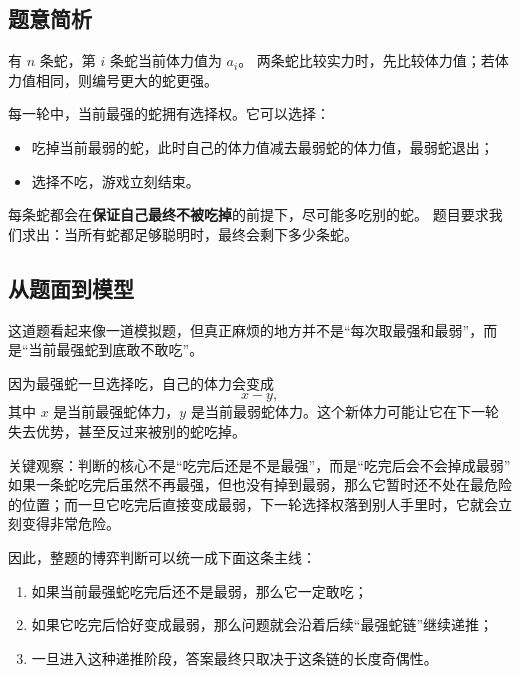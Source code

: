\documentclass{book}
\begin{document}
\subsection{题意简析}

有 $n$ 条蛇，第 $i$ 条蛇当前体力值为 $a_i$。  
两条蛇比较实力时，先比较体力值；若体力值相同，则编号更大的蛇更强。

每一轮中，当前最强的蛇拥有选择权。它可以选择：

\begin{itemize}[leftmargin=2em,itemsep=1pt,topsep=2pt,parsep=0pt,partopsep=0pt]
    \item 吃掉当前最弱的蛇，此时自己的体力值减去最弱蛇的体力值，最弱蛇退出；
    \item 选择不吃，游戏立刻结束。
\end{itemize}

每条蛇都会在\textbf{保证自己最终不被吃掉}的前提下，尽可能多吃别的蛇。  
题目要求我们求出：当所有蛇都足够聪明时，最终会剩下多少条蛇。

\subsection{从题面到模型}

这道题看起来像一道模拟题，但真正麻烦的地方并不是“每次取最强和最弱”，而是“当前最强蛇到底敢不敢吃”。

因为最强蛇一旦选择吃，自己的体力会变成
\[
x-y,
\]
其中 $x$ 是当前最强蛇体力，$y$ 是当前最弱蛇体力。这个新体力可能让它在下一轮失去优势，甚至反过来被别的蛇吃掉。

\begin{keybox}{关键观察：判断的核心不是“吃完后还是不是最强”，而是“吃完后会不会掉成最弱”}
如果一条蛇吃完后虽然不再最强，但也没有掉到最弱，那么它暂时还不处在最危险的位置；而一旦它吃完后直接变成最弱，下一轮选择权落到别人手里时，它就会立刻变得非常危险。
\end{keybox}

因此，整题的博弈判断可以统一成下面这条主线：

\begin{enumerate}[leftmargin=2em,itemsep=1pt,topsep=2pt,parsep=0pt,partopsep=0pt]
    \item 如果当前最强蛇吃完后还不是最弱，那么它一定敢吃；
    \item 如果它吃完后恰好变成最弱，那么问题就会沿着后续“最强蛇链”继续递推；
    \item 一旦进入这种递推阶段，答案最终只取决于这条链的长度奇偶性。
\end{enumerate}
\end{document}

